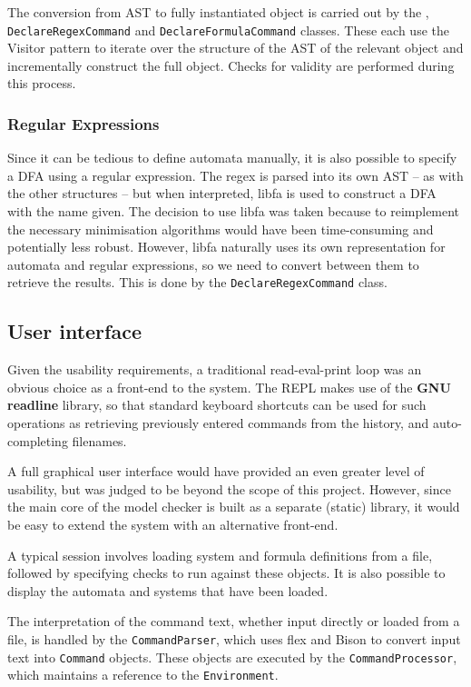 \documentclass[11pt]{article}
\theoremstyle{definition}
\begin{document}
The conversion from AST to fully instantiated object is carried out by the
, \texttt{DeclareRegexCommand} and
\texttt{DeclareFormulaCommand} classes. These each use the Visitor pattern to
iterate over the structure of the AST of the relevant object and incrementally
construct the full object. Checks for validity are performed during this
process.

\subsubsection{Regular Expressions}

Since it can be tedious to define automata manually, it is also possible to
specify a DFA using a regular expression. The regex is parsed into its own AST
-- as with the other structures -- but when interpreted, libfa is used to
construct a DFA with the name given. The decision to use libfa was taken
because to reimplement the necessary minimisation algorithms would have been
time-consuming and potentially less robust. However, libfa naturally uses its
own representation for automata and regular expressions, so we need to convert
between them to retrieve the results. This is done by the \texttt{DeclareRegexCommand} class.

\subsection{User interface}

Given the usability requirements, a traditional read-eval-print loop was an
obvious choice as a front-end to the system.  The REPL makes use of the
\textbf{GNU readline} library, so that standard keyboard shortcuts can be used
for such operations as retrieving previously entered commands from the history,
and auto-completing filenames. 

A full graphical user interface would have provided an even greater level of
usability, but was judged to be beyond the scope of this project. However,
since the main core of the model checker is built as a separate (static)
library, it would be easy to extend the system with an alternative front-end.

A typical session involves loading system and formula definitions from a file,
followed by specifying checks to run against these objects. It is also possible
to display the automata and systems that have been loaded.  

The interpretation of the command text, whether input directly or loaded from a
file, is handled by the \texttt{CommandParser}, which uses flex and Bison to
convert input text into \texttt{Command} objects. These objects are executed by
the \texttt{CommandProcessor}, which maintains a reference to the
\texttt{Environment}.
\end{document}
